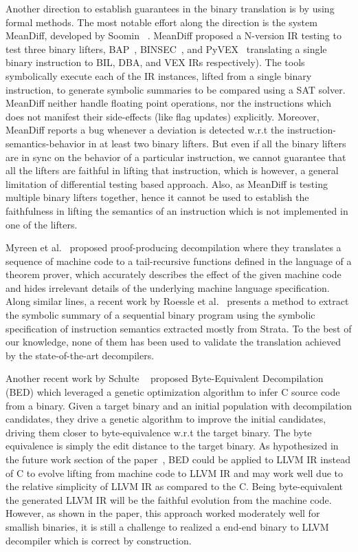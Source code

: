 Another direction to establish guarantees in the binary translation is by using
formal methods. The most notable effort along the direction is the system
MeanDiff, developed by Soomin \etal~\cite{ASE2017}.
%
MeanDiff proposed a N-version IR testing to test three binary lifters,
         BAP~\cite{BAP:CAV11}, BINSEC~\cite{BINSEC2011}, and PyVEX~\cite{PYVEX}
         translating a single binary instruction  to BIL, DBA, and VEX IRs
         respectively). The tools symbolically execute each of the IR
         instances, lifted from a single binary instruction, to generate
         symbolic summaries to be compared using a SAT solver. MeanDiff neither
         handle floating point operations, nor the instructions which does not
         manifest their side-effects (like flag updates) explicitly. Moreover,
         MeanDiff reports a bug whenever a deviation is detected w.r.t the
         instruction-semantics-behavior in at least two binary lifters. But
         even if all the binary lifters are in sync on the behavior of a
         particular instruction, we cannot guarantee that all the lifters are
         faithful in lifting that instruction, which is however, a general
         limitation of differential testing based approach. Also, as MeanDiff
         is testing multiple binary lifters  together, hence it cannot be used
         to establish the faithfulness in lifting the semantics of an
         instruction which is not implemented in one of the lifters.
%

Myreen et al.~\cite{Myreen:FMCAD:2008,Myreen:FMCAD:2012} proposed
proof-producing decompilation where they translates a sequence of machine code
to a tail-recursive functions defined in the language of a theorem prover,
   which accurately describes the effect of the given machine code and hides
   irrelevant details of the underlying machine language specification. Along
   similar lines,  a recent work by Roessle et al.~\cite{Roessle:CPP19}
   presents a method to extract the symbolic summary of a sequential binary
   program using the symbolic specification of instruction semantics extracted
   mostly from Strata. To the best of our knowledge, none of them has been used
   to validate the translation achieved by the state-of-the-art decompilers.
%

Another recent work by Schulte \etal~\cite{eschulte2018bed} proposed
Byte-Equivalent Decompilation (BED) which leveraged a genetic optimization
algorithm to infer C source code from a binary. Given a target binary and an
initial population with decompilation candidates, they  drive a genetic
algorithm to improve the initial candidates, driving them closer to
byte-equivalence w.r.t the target binary. The byte equivalence  is simply the
edit distance to the target binary. As hypothesized in the future work section
of the paper~\cite{eschulte2018bed}, BED could be applied to LLVM IR instead of
C to evolve lifting from machine code to LLVM IR and may work well due to the
relative simplicity of LLVM IR as compared to the C. Being byte-equivalent the
generated LLVM IR will be the faithful evolution from the machine code.
However, as shown in the paper, this approach worked moderately well for
smallish binaries, it is still a challenge to realized a end-end binary to LLVM
decompiler which is correct by construction.

